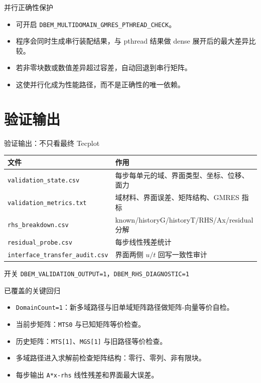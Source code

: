 \documentclass[aspectratio=169,UTF8]{ctexbeamer}
\newcommand{\code}[1]{\texttt{\small #1}}
\begin{document}
\begin{frame}{并行正确性保护}
  \begin{itemize}
    \item 可开启 \code{DBEM\_MULTIDOMAIN\_GMRES\_PTHREAD\_CHECK}。
    \item 程序会同时生成串行装配结果，与 pthread 结果做 dense 展开后的最大差异比较。
    \item 若非零块数或数值差异超过容差，自动回退到串行矩阵。
    \item 这使并行化成为性能路径，而不是正确性的唯一依赖。
  \end{itemize}
\end{frame}

\section{验证输出}

\begin{frame}{验证输出：不只看最终 Tecplot}
  \begin{table}
    \centering
    \begin{tabular}{ll}
      \toprule
      文件 & 作用 \\
      \midrule
      \code{validation\_state.csv} & 每步每单元的域、界面类型、坐标、位移、面力 \\
      \code{validation\_metrics.txt} & 域材料、界面误差、矩阵结构、GMRES 指标 \\
      \code{rhs\_breakdown.csv} & known/historyG/historyT/RHS/Ax/residual 分解 \\
      \code{residual\_probe.csv} & 每步线性残差统计 \\
      \code{interface\_transfer\_audit.csv} & 界面两侧 $u/t$ 回写一致性审计 \\
      \bottomrule
    \end{tabular}
  \end{table}

  \begin{block}{开关}
    \code{DBEM\_VALIDATION\_OUTPUT=1}，\code{DBEM\_RHS\_DIAGNOSTIC=1}
  \end{block}
\end{frame}

\begin{frame}{已覆盖的关键回归}
  \begin{itemize}
    \item \code{DomainCount=1}：新多域路径与旧单域矩阵路径做矩阵-向量等价自检。
    \item 当前步矩阵：\code{MTS0} 与已知矩阵等价检查。
    \item 历史矩阵：\code{MTS[1]}、\code{MGS[1]} 与旧路径等价检查。
    \item 多域路径进入求解前检查矩阵结构：零行、零列、非有限块。
    \item 每步输出 \code{A*x-rhs} 线性残差和界面最大误差。
  \end{itemize}
\end{frame}
\end{document}
